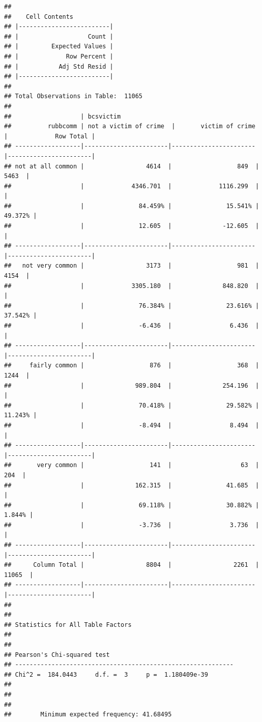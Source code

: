 \documentclass[
]{book}
\begin{document}
\begin{verbatim}
## 
##    Cell Contents
## |-------------------------|
## |                   Count |
## |         Expected Values |
## |             Row Percent |
## |           Adj Std Resid |
## |-------------------------|
## 
## Total Observations in Table:  11065 
## 
##                   | bcsvictim 
##          rubbcomm | not a victim of crime  |       victim of crime  |             Row Total | 
## ------------------|-----------------------|-----------------------|-----------------------|
## not at all common |                 4614  |                  849  |                 5463  | 
##                   |             4346.701  |             1116.299  |                       | 
##                   |               84.459% |               15.541% |               49.372% | 
##                   |               12.605  |              -12.605  |                       | 
## ------------------|-----------------------|-----------------------|-----------------------|
##   not very common |                 3173  |                  981  |                 4154  | 
##                   |             3305.180  |              848.820  |                       | 
##                   |               76.384% |               23.616% |               37.542% | 
##                   |               -6.436  |                6.436  |                       | 
## ------------------|-----------------------|-----------------------|-----------------------|
##     fairly common |                  876  |                  368  |                 1244  | 
##                   |              989.804  |              254.196  |                       | 
##                   |               70.418% |               29.582% |               11.243% | 
##                   |               -8.494  |                8.494  |                       | 
## ------------------|-----------------------|-----------------------|-----------------------|
##       very common |                  141  |                   63  |                  204  | 
##                   |              162.315  |               41.685  |                       | 
##                   |               69.118% |               30.882% |                1.844% | 
##                   |               -3.736  |                3.736  |                       | 
## ------------------|-----------------------|-----------------------|-----------------------|
##      Column Total |                 8804  |                 2261  |                11065  | 
## ------------------|-----------------------|-----------------------|-----------------------|
## 
##  
## Statistics for All Table Factors
## 
## 
## Pearson's Chi-squared test 
## ------------------------------------------------------------
## Chi^2 =  184.0443     d.f. =  3     p =  1.180409e-39 
## 
## 
##  
##        Minimum expected frequency: 41.68495
\end{verbatim}
\end{document}
